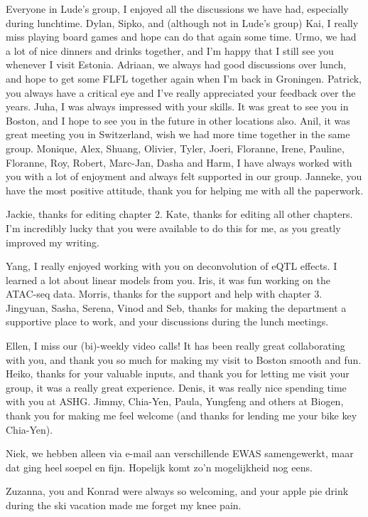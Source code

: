 \begin{appendices}
Everyone in Lude's group, I enjoyed all the discussions we have had, especially during lunchtime. Dylan, Sipko, and (although not in Lude's group) Kai, I really miss playing board games and hope can do that again some time. Urmo, we had a lot of nice dinners and drinks together, and I'm happy that I still see you whenever I visit Estonia. Adriaan, we always had good discussions over lunch, and hope to get some FLFL together again when I'm back in Groningen. Patrick, you always have a critical eye and I've really appreciated your feedback over the years. Juha, I was always impressed with your skills. It was great to see you in Boston, and I hope to see you in the future in other locations also. Anil, it was great meeting you in Switzerland, wish we had more time together in the same group. Monique, Alex, Shuang, Olivier, Tyler, Joeri, Floranne, Irene, Pauline, Floranne, Roy, Robert, Marc-Jan, Dasha and Harm, I have always worked with you with a lot of enjoyment and always felt supported in our group. Janneke, you have the most positive attitude, thank you for helping me with all the paperwork.


Jackie, thanks for editing chapter 2. Kate, thanks for editing all other chapters. I'm incredibly lucky that you were available to do this for me, as you greatly improved my writing. 

Yang, I really enjoyed working with you on deconvolution of eQTL effects. I learned a lot about linear models from you. Iris, it was fun working on the ATAC-seq data. Morris, thanks for the support and help with chapter 3. Jingyuan, Sasha, Serena, Vinod and Seb, thanks for making the department a supportive place to work, and your discussions during the lunch meetings.

Ellen, I miss our (bi)-weekly video calls! It has been really great collaborating with you, and thank you so much for making my visit to Boston smooth and fun. Heiko, thanks for your valuable inputs, and thank you for letting me visit your group, it was a really great experience. Denis, it was really nice spending time with you at ASHG. Jimmy, Chia-Yen, Paula, Yungfeng and others at Biogen, thank you for making me feel welcome (and thanks for lending me your bike key Chia-Yen).

Niek, we hebben alleen via e-mail aan verschillende EWAS samengewerkt, maar dat ging heel soepel en fijn. Hopelijk komt zo'n mogelijkheid nog eens. 

Zuzanna, you and Konrad were always so welcoming, and your apple pie drink during the ski vacation made me forget my knee pain.


\end{appendices}
